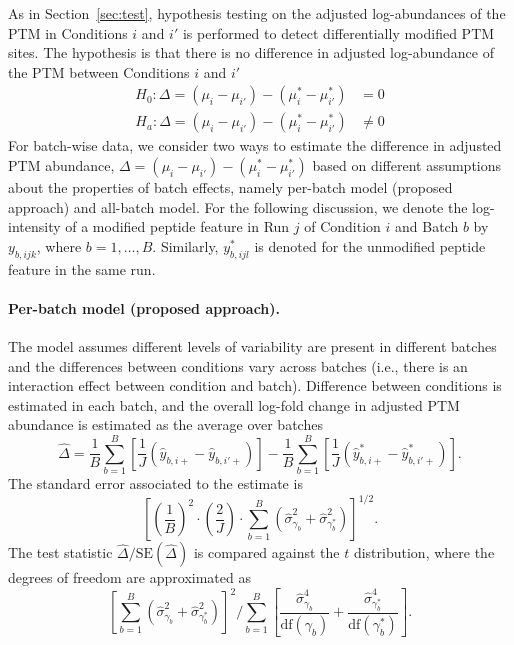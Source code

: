 \documentclass{mcp}
\def\secref#1{Section~\ref{#1}}
\begin{document}
As in \secref{sec:test}, hypothesis testing on the adjusted log-abundances of the PTM in Conditions $i$ and $i'$ is performed to detect differentially modified PTM sites. The hypothesis is that there is no difference in adjusted log-abundance of the PTM between Conditions $i$ and $i'$
\begin{align*}
H_{0}: \Delta = (\mu_{i} - \mu_{i'}) - (\mu_{i}^{\ast} - \mu_{i'}^{\ast}) &= 0 \\
H_{a}: \Delta = (\mu_{i} - \mu_{i'}) - (\mu_{i}^{\ast} - \mu_{i'}^{\ast}) &\neq 0
\end{align*}
For batch-wise data, we consider two ways to estimate the difference in adjusted PTM abundance, $\Delta = (\mu_{i} - \mu_{i'}) - (\mu_{i}^{\ast} - \mu_{i'}^{\ast})$ based on different assumptions about the properties of batch effects, namely per-batch model (proposed approach) and all-batch model. For the following discussion, we denote the log-intensity of a modified peptide feature in Run $j$ of Condition $i$ and Batch $b$ by $y_{b, ijk}$, where $b = 1, \ldots, B$. Similarly, $y_{b, ijl}^{\ast}$ is denoted for the unmodified peptide feature in the same run. 

\paragraph{Per-batch model (proposed approach).} 
The model assumes different levels of variability are present in different batches and the differences between conditions vary across batches (i.e., there is an interaction effect between condition and batch). Difference between conditions is estimated in each batch, and the overall log-fold change in adjusted PTM abundance is estimated as the average over batches
\[
\hat{\Delta} = \frac{1}{B} \sum_{b=1}^{B} \left[ \frac{1}{J} \left( \hat{y}_{b,i+} - \hat{y}_{b,i'+} \right) \right]
- \frac{1}{B} \sum_{b=1}^{B} \left[ \frac{1}{J} \left( \hat{y}_{b,i+}^{\ast} - \hat{y}_{b,i'+}^{\ast} \right) \right].
\]
The standard error associated to the estimate is 
\[
\left[ \left(\frac{1}{B}\right)^2 \cdot \left( \frac{2}{J} \right) \cdot \sum_{b=1}^{B} \left( \hat{\sigma}_{\gamma_b}^{2} + \hat{\sigma}_{\gamma_b^{\ast}}^{2} \right) \right]^{1/2}.
\]
The test statistic $\hat{\Delta} / \mathrm{SE}(\hat{\Delta})$ is compared against the $t$ distribution, where the degrees of freedom are approximated as
\[
\left[ \sum_{b=1}^{B} \left( \hat{\sigma}_{\gamma_{b}}^{2} + \hat{\sigma}_{\gamma_{b}^{\ast}}^{2} \right) \right]^2 \bigg/
\sum_{b=1}^{B} \left[ \frac{\hat{\sigma}_{\gamma_{b}}^{4}}{  \mathrm{df}(\gamma_b)} + \frac{\hat{\sigma}_{\gamma_{b}^{\ast}}^{4}}{\mathrm{df}(\gamma_b^{\ast})} \right].
\]
\end{document}
